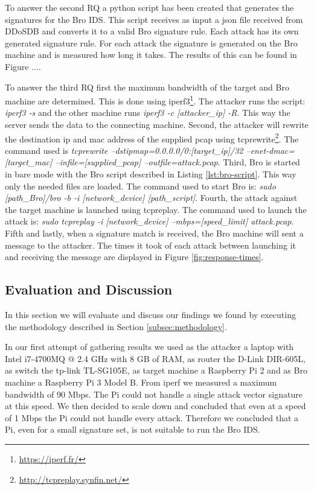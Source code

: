 To answer the second RQ a python script has been created that generates the signatures for the Bro IDS. This script receives as input a json file received from DDoSDB and converts it to a valid Bro signature rule. Each attack has its own generated signature rule. For each attack the signature is generated on the Bro machine and is measured how long it takes. The results of this can be found in Figure $\dots$.

To answer the third RQ first the maximum bandwidth of the target and Bro machine are determined. This is done using iperf3\footnote{\url{https://iperf.fr/}}. The attacker runs the script: \emph{iperf3 -s} and the other machine runs \emph{iperf3 -c [attacker\_ip] -R}. This way the server sends the data to the connecting machine. Second, the attacker will rewrite the destination ip and mac address of the supplied pcap using tcprewrite\footnote{\url{http://tcpreplay.synfin.net/}}. The command used is \emph{tcprewrite --dstipmap=0.0.0.0/0:[target\_ip]/32 --enet-dmac=[target\_mac] --infile=[supplied\_pcap] --outfile=attack.pcap}. Third, Bro is started in bare mode with the Bro script described in Listing \ref{lst:bro-script}. This way only the needed files are loaded. The command used to start Bro is: \emph{sudo [path\_Bro]/bro -b -i [network\_device] [path\_script]}. Fourth, the attack against the target machine is launched using tcpreplay. The command used to launch the attack is: \emph{sudo tcpreplay -i [network\_device] --mbps=[speed\_limit] attack.pcap}. Fifth and lastly, when a signature match is received, the Bro machine will sent a message to the attacker. The times it took of each attack between launching it and receiving the message are displayed in Figure \ref{fig:response-times}.






\subsection{Evaluation and Discussion}\label{subsec:evaluation-discussion}
In this section we will evaluate and discuss our findings we found by executing the methodology described in Section \ref{subsec:methodology}.

In our first attempt of gathering results we used as the attacker a laptop with Intel i7-4700MQ @ 2.4 GHz with 8 GB of RAM, as router the D-Link DIR-605L, as switch the tp-link TL-SG105E, as target machine a Raspberry Pi 2 and as Bro machine a Raspberry Pi 3 Model B. From iperf we measured a maximum bandwidth of 90 Mbps. The Pi could not handle a single attack vector signature at this speed. We then decided to scale down and concluded that even at a speed of 1 Mbps the Pi could not handle every attack. Therefore we concluded that a Pi, even for a small signature set, is not suitable to run the Bro IDS.  

